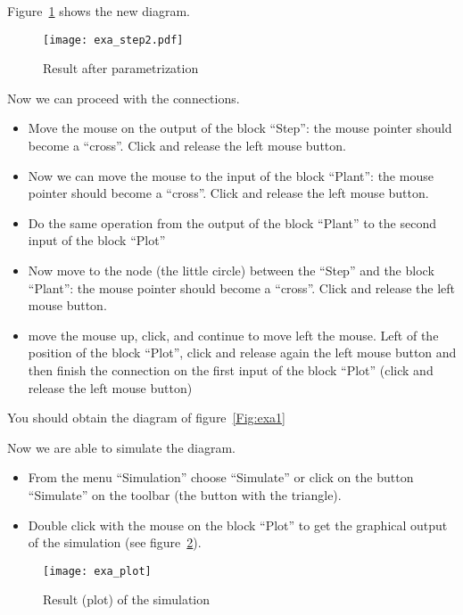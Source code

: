 Figure~\ref{Fig:exa_step2} shows the new diagram.

\begin{figure}[htbp]	%
\centering
\texttt{[image: exa\_step2.pdf]}
\caption{Result after parametrization}
\label{Fig:exa_step2}
\end{figure}

Now we can proceed with the connections.

\begin{itemize}
\item Move the mouse on the output of the block ``Step'': the mouse pointer 
should become a ``cross''. Click and release the left mouse button.
\item Now we can move the mouse to the input of the block ``Plant'': the mouse 
pointer should become a ``cross''. Click and release the left mouse button.
\item Do the same operation from the output of the block ``Plant'' to the 
second input of the block ``Plot''
\item Now move to the node (the little circle) between the ``Step'' and the 
block ``Plant'': the mouse 
pointer should become a ``cross''. Click and release the left mouse button.
\item move the mouse up, click, and continue to move left the mouse. Left of 
the position of the block ``Plot'', click and release again the left mouse 
button and then finish the connection on the first input of the block ``Plot'' 
(click and release the left mouse button)
\end{itemize}

You should obtain the diagram of figure~\ref{Fig:exa1}

Now we are able to simulate the diagram.

\begin{itemize}
\item From the menu ``Simulation'' choose ``Simulate'' or click on the button 
``Simulate'' on the toolbar (the button with the triangle).
\item Double click with the mouse on the block ``Plot'' to get the graphical 
output of the simulation (see figure~\ref{Fig:exaplot}).
\end{itemize}

\begin{figure}[htbp]	%
\centering
\texttt{[image: exa\_plot]}
\caption{Result (plot) of the simulation}
\label{Fig:exaplot}
\end{figure}

